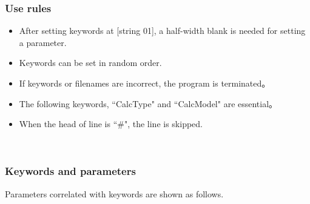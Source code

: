\subsubsection{Use rules}
\begin{itemize}
\item After setting keywords at [string 01], a half-width blank is needed for setting a parameter.
\item Keywords can be set in random order.
\item If keywords or filenames are incorrect, the program is terminated。
\item The following keywords, ``CalcType" and ``CalcModel" are essential。
\item When the head of line is ``$\#$", the line is skipped.
\end{itemize}
~\subsubsection{Keywords and parameters}
Parameters correlated with keywords are shown as follows.

